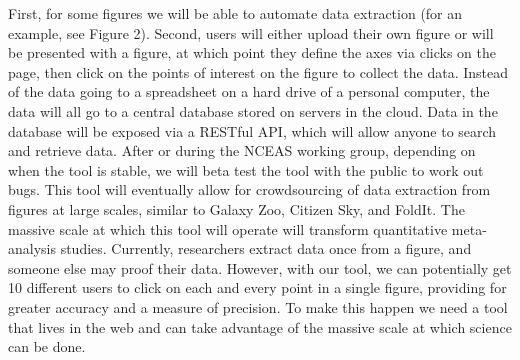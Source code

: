 \documentclass[pdftex,11pt,a4paper]{article}\usepackage{graphicx, color}
\begin{document}
First, for some figures we will be able to automate data extraction (for an example, see Figure 2).  Second, users will either upload their own figure or will be presented with a figure, at which point they define the axes via clicks on the page, then click on the points of interest on the figure to collect the data.  Instead of the data going to a spreadsheet on a hard drive of a personal computer, the data will all go to a central database stored on servers in the cloud.  Data in the database will be exposed via a RESTful API, which will allow anyone to search and retrieve data.  After or during the NCEAS working group, depending on when the tool is stable, we will beta test the tool with the public to work out bugs.  This tool will eventually allow for crowdsourcing of data extraction from figures at large scales, similar to Galaxy Zoo, Citizen Sky, and FoldIt.  The massive scale at which this tool will operate will transform quantitative meta-analysis studies.  Currently, researchers extract data once from a figure, and someone else may proof their data.  However, with our tool, we can potentially get 10 different users to click on each and every point in a single figure, providing for greater accuracy and a measure of precision.  To make this happen we need a tool that lives in the web and can take advantage of the massive scale at which science can be done. \\
\end{document}

